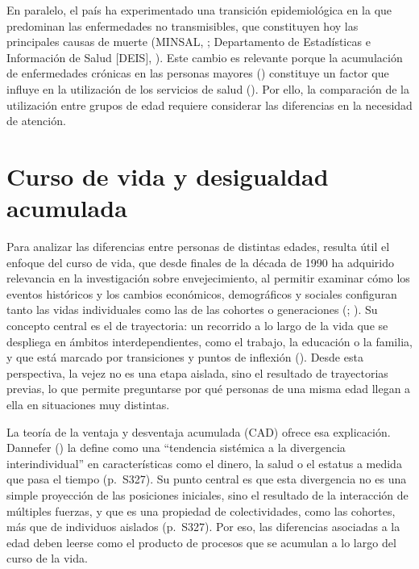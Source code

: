 \documentclass[
  spanish,
  a4paper,
  oneside]{scrbook}
\begin{document}
En paralelo, el país ha experimentado una transición epidemiológica en
la que predominan las enfermedades no transmisibles, que constituyen hoy
las principales causas de muerte (MINSAL,
; Departamento de Estadísticas e
Información de Salud {[}DEIS{]},
). Este cambio es relevante
porque la acumulación de enfermedades crónicas en las personas mayores
() constituye un
factor que influye en la utilización de los servicios de salud
(). Por
ello, la comparación de la utilización entre grupos de edad requiere
considerar las diferencias en la necesidad de atención.

\section{Curso de vida y desigualdad
acumulada}\label{curso-de-vida-y-desigualdad-acumulada}

Para analizar las diferencias entre personas de distintas edades,
resulta útil el enfoque del curso de vida, que desde finales de la
década de 1990 ha adquirido relevancia en la investigación sobre
envejecimiento, al permitir examinar cómo los eventos históricos y los
cambios económicos, demográficos y sociales configuran tanto las vidas
individuales como las de las cohortes o generaciones
(;
). Su concepto central es el de trayectoria: un recorrido a
lo largo de la vida que se despliega en ámbitos interdependientes, como
el trabajo, la educación o la familia, y que está marcado por
transiciones y puntos de inflexión
(). Desde esta
perspectiva, la vejez no es una etapa aislada, sino el resultado de
trayectorias previas, lo que permite preguntarse por qué personas de una
misma edad llegan a ella en situaciones muy distintas.

La teoría de la ventaja y desventaja acumulada (CAD) ofrece esa
explicación. Dannefer () la
define como una ``tendencia sistémica a la divergencia interindividual''
en características como el dinero, la salud o el estatus a medida que
pasa el tiempo (p.~S327). Su punto central es que esta divergencia no es
una simple proyección de las posiciones iniciales, sino el resultado de
la interacción de múltiples fuerzas, y que es una propiedad de
colectividades, como las cohortes, más que de individuos aislados
(p.~S327). Por eso, las diferencias asociadas a la edad deben leerse
como el producto de procesos que se acumulan a lo largo del curso de la
vida.
\end{document}
